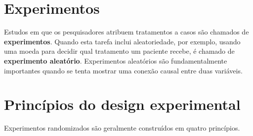 \documentclass[
]{book}
\theoremstyle{definition}
\theoremstyle{definition}
\theoremstyle{definition}
\theoremstyle{definition}
\theoremstyle{remark}
\begin{document}
\hypertarget{experimentsSection}{%
\section{Experimentos}\label{experimentsSection}}

Estudos em que os pesquisadores atribuem tratamentos a casos são chamados de \textbf{experimentos}. Quando esta tarefa inclui aleatoriedade, por exemplo, usando uma moeda para decidir qual tratamento um paciente recebe, é chamado de \textbf{experimento aleatório}. Experimentos aleatórios são fundamentalmente importantes quando se tenta mostrar uma conexão causal entre duas variáveis.

\hypertarget{experimentalDesignPrinciples}{%
\section{Princípios do design experimental}\label{experimentalDesignPrinciples}}

Experimentos randomizados são geralmente construídos em quatro princípios.
\end{document}
